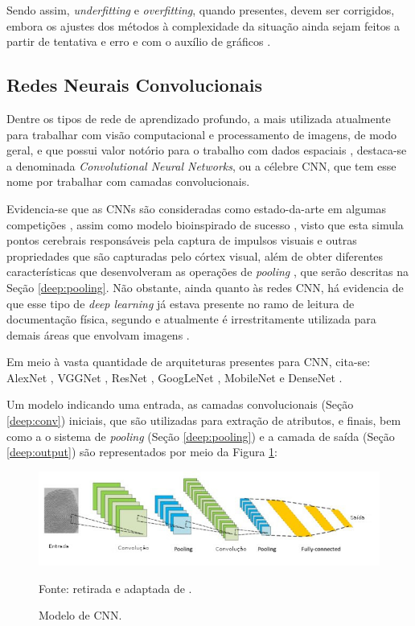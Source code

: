 Sendo assim, \textit{underfitting} e \textit{overfitting}, quando presentes, devem ser corrigidos, embora os ajustes dos métodos à complexidade da situação ainda sejam feitos a partir de tentativa e erro e com o auxílio de gráficos \cite{Goodfellow2016}.


\subsection{Redes Neurais Convolucionais}
\label{deep:CNN}

Dentre os tipos de rede de aprendizado profundo, a mais utilizada atualmente para trabalhar com visão computacional e processamento de imagens, de modo geral, e que possui valor notório para o trabalho com dados espaciais \cite{Goodfellow2016, ponti2018funciona, Ghosh2019}, destaca-se a denominada \textit{Convolutional Neural Networks}\cite{LeCun1999}, ou a célebre CNN, que tem esse nome por trabalhar com camadas convolucionais.

Evidencia-se que as CNNs são consideradas como estado-da-arte em algumas competições \cite{Parkhi2015}, assim como modelo bioinspirado de sucesso \cite{Goodfellow2016}, visto que esta simula pontos cerebrais responsáveis pela captura de impulsos visuais e outras propriedades que são capturadas pelo córtex visual, além de obter diferentes características que desenvolveram as operações de \textit{pooling} \cite{Goodfellow2016}, que serão descritas na Seção \ref{deep:pooling}. Não obstante, ainda quanto às redes CNN, há evidencia de que esse tipo de \textit{deep learning} já estava presente no ramo de leitura de documentação física, segundo \cite{Goodfellow2016} e atualmente é irrestritamente utilizada para demais áreas que envolvam imagens \cite{Ghosh2019}.

Em meio à vasta quantidade de arquiteturas presentes para CNN, cita-se: AlexNet \cite{krizhevsky2012imagenet}, VGGNet \cite{Simonyan2015}, ResNet \cite{He2016}, GoogLeNet \cite{Szegedy2015}, MobileNet \cite{Howard2017} e DenseNet \cite{Huang2017}.

Um modelo indicando uma entrada, as camadas convolucionais (Seção \ref{deep:conv}) iniciais, que são utilizadas para extração de atributos, e finais, bem como a o sistema de \textit{pooling} (Seção \ref{deep:pooling}) e a camada de saída (Seção \ref{deep:output}) são representados por meio da Figura \ref{deep:fig:10}:

\begin{figure}[H]
    \centering
    \caption{Modelo de CNN.}
    \includegraphics[width=1\linewidth]{recursos/imagens/deep/cnn.jpg}
    \label{deep:fig:10}

    \vspace*{1 cm}
    Fonte: retirada e adaptada de \cite{Minaee2021DeepClassification}.
\end{figure}

